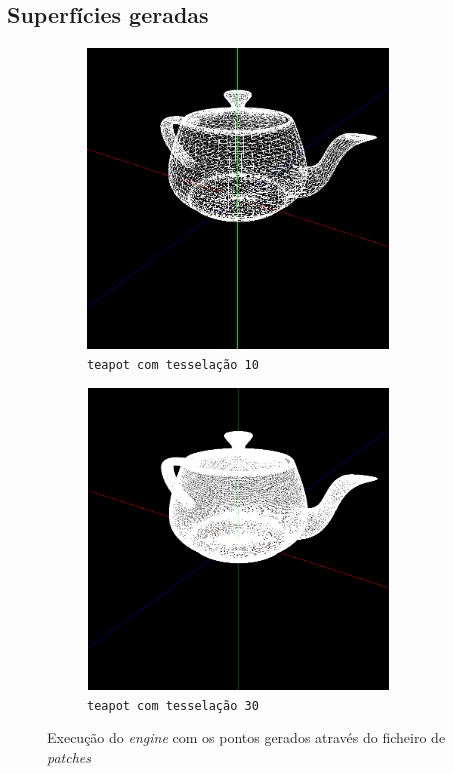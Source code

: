 \documentclass[11pt,a4paper]{report}
\begin{document}
\subsection{Superfícies geradas}

\vspace{1cm}
\begin{figure}[H]
\centering
\begin{subfigure}{0.5\textwidth}
  \centering
  \includegraphics[width = 8cm,height = 8cm]{teapot_tesselation_10.png}
  \caption{\texttt{teapot com tesselação 10}}
  \label{fig:teapot com tesselação 10}
\end{subfigure}%
\begin{subfigure}{0.5\textwidth}
  \centering
  \includegraphics[width = 8cm,height = 8cm]{teapot_tesselation_30.png}
  \caption{\texttt{teapot com tesselação 30}}
  \label{fig:teapot com tesselação 30}
\end{subfigure}
\label{fig:teapots}
\caption{Execução do \textit{engine} com os pontos gerados através do ficheiro de \textit{patches}}
\end{figure}
\end{document}
